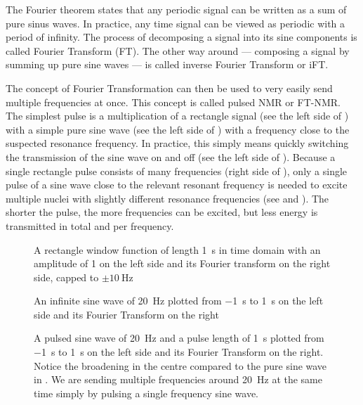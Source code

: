 The Fourier theorem states that any periodic signal can be written as a sum of pure sinus waves. In practice, any time signal can be viewed as periodic with a period of infinity. The process of decomposing a signal into its sine components is called Fourier Transform (FT). The other way around --- composing a signal by summing up pure sine waves --- is called inverse Fourier Transform or iFT.

The concept of Fourier Transformation can then be used to very easily send multiple frequencies at once. This concept is called pulsed NMR or FT-NMR. The simplest pulse is a multiplication of a rectangle signal (see the left side of ) with a simple pure sine wave (see the left side of ) with a frequency close to the suspected resonance frequency. In practice, this simply means quickly switching the transmission of the sine wave on and off (see the left side of ). Because a single rectangle pulse consists of many frequencies (right side of ), only a single pulse of a sine wave close to the relevant resonant frequency is needed to excite multiple nuclei with slightly different resonance frequencies (see  and ). The shorter the pulse, the more frequencies can be excited, but less energy is transmitted in total and per frequency.
\begin{figure}[tbh]
    
    \caption{A rectangle window function of length \qty{1}{\second} in time domain with an amplitude of 1 on the left side and its Fourier transform on the right side, capped to \(\pm{}\qty{10}{\hertz}\)}
\end{figure}

\begin{figure}[tbh]
    
    \caption{An infinite sine wave of \qty{20}{\hertz} plotted from \qty{-1}{\second} to \qty{1}{\second} on the left side and its Fourier Transform on the right}
\end{figure}

\begin{figure}[tbh]
    
    \caption{A pulsed sine wave of \qty{20}{\hertz} and a pulse length of \qty{1}{\second} plotted from \qty{-1}{\second} to \qty{1}{\second} on the left side and its Fourier Transform on the right. Notice the broadening in the centre compared to the pure sine wave in . We are sending multiple frequencies around \qty{20}{\hertz} at the same time simply by pulsing a single frequency sine wave.}
\end{figure}

